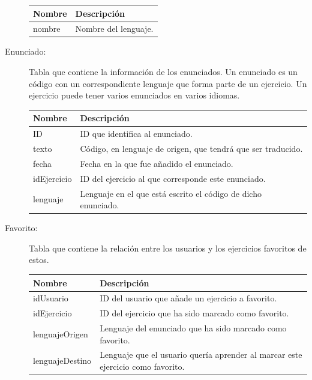 \begin{description}
\begin{tabularx}{14cm}{|l|X|}
\hline
\textbf{Nombre} & \textbf{Descripción}                                                              \\ \hline
nombre       & Nombre del lenguaje. \\ \hline
\end{tabularx}
\vspace{1em}

\item[Enunciado:] Tabla que contiene la información de los enunciados. Un enunciado es un código con un correspondiente lenguaje que forma parte de un ejercicio. Un ejercicio puede tener varios enunciados en varios idiomas.

\begin{tabularx}{14cm}{|l|X|}
\hline
\textbf{Nombre} & \textbf{Descripción}                                                              \\ \hline
ID       & ID que identifica al enunciado. \\ \hline
texto     & Código, en lenguaje de origen, que tendrá que ser traducido.                                           \\ \hline
fecha     & Fecha en la que fue añadido el enunciado.                                           \\ \hline
idEjercicio     & ID del ejercicio al que corresponde este enunciado.                                           \\ \hline
lenguaje     & Lenguaje en el que está escrito el código de dicho enunciado.                                           \\ \hline
\end{tabularx}
\vspace{1em}

\item[Favorito:] Tabla que contiene la relación entre los usuarios y los ejercicios favoritos de estos.

\begin{tabularx}{14cm}{|l|X|}
\hline
\textbf{Nombre} & \textbf{Descripción}                                                              \\ \hline
idUsuario       & ID del usuario que añade un ejercicio a favorito. \\ \hline
idEjercicio     & ID del ejercicio que ha sido marcado como favorito.                                           \\ \hline
lenguajeOrigen     & Lenguaje del enunciado que ha sido marcado como favorito.                                           \\ \hline
lenguajeDestino     & Lenguaje que el usuario quería aprender al marcar este ejercicio como favorito.                                           \\ \hline
\end{tabularx}
\vspace{1em}


\end{description}
